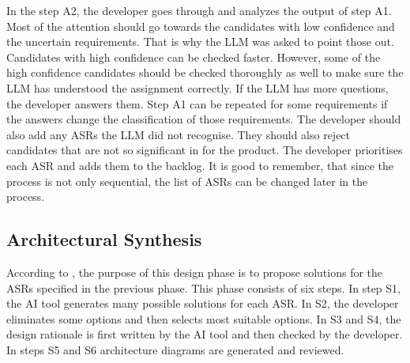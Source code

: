 In the step A2, the developer goes through and analyzes the output of step A1. Most of the attention should go towards the candidates with low confidence and the uncertain requirements. That is why the LLM was asked to point those out. Candidates with high confidence can be checked faster. However, some of the high confidence candidates should be checked thoroughly as well to make sure the LLM has understood the assignment correctly. If the LLM has more questions, the developer answers them. Step A1 can be repeated for some requirements if the answers change the classification of those requirements. The developer should also add any ASRs the LLM did not recognise. They should also reject candidates that are not so significant in for the product. The developer prioritises each ASR and adds them to the backlog. It is good to remember, that since the process is not only sequential, the list of ASRs can be changed later in the process.

\subsection{Architectural Synthesis}
\label{sec:architectural_synthesis}

According to \textcite{hofmeisterGeneralModelSoftware2007}, the purpose of this design phase is to propose solutions for the ASRs specified in the previous phase. This phase consists of six steps. In step S1, the AI tool generates many possible solutions for each ASR. In S2, the developer eliminates some options and then selects most suitable options. In S3 and S4, the design rationale is first written by the AI tool and then checked by the developer. In steps S5 and S6 architecture diagrams are generated and reviewed.

